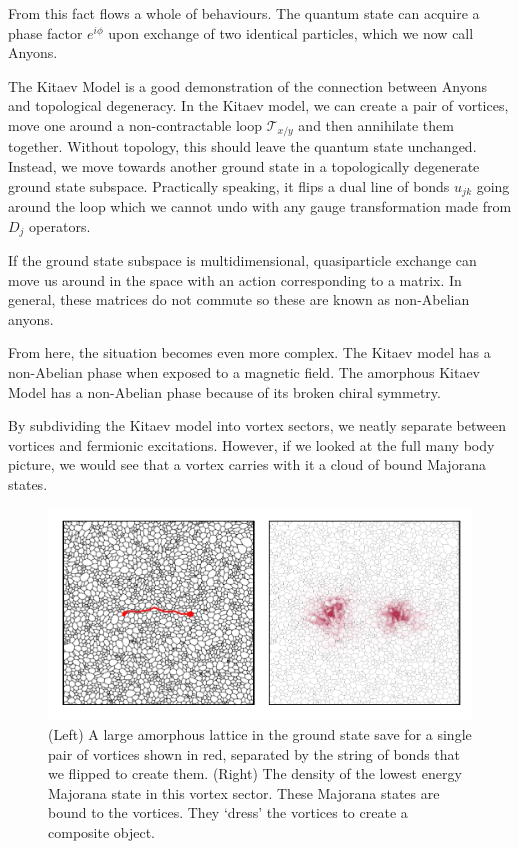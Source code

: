 From this fact flows a whole of behaviours. The quantum state can acquire a phase factor \(e^{i\phi}\) upon exchange of two identical particles, which we now call Anyons.

The Kitaev Model is a good demonstration of the connection between Anyons and topological degeneracy. In the Kitaev model, we can create a pair of vortices, move one around a non-contractable loop \(\mathcal{T}_{x/y}\) and then annihilate them together. Without topology, this should leave the quantum state unchanged. Instead, we move towards another ground state in a topologically degenerate ground state subspace. Practically speaking, it flips a dual line of bonds \(u_{jk}\) going around the loop which we cannot undo with any gauge transformation made from \(D_j\) operators.

If the ground state subspace is multidimensional, quasiparticle exchange can move us around in the space with an action corresponding to a matrix. In general, these matrices do not commute so these are known as non-Abelian anyons.

From here, the situation becomes even more complex. The Kitaev model has a non-Abelian phase when exposed to a magnetic field. The amorphous Kitaev Model has a non-Abelian phase because of its broken chiral symmetry.

By subdividing the Kitaev model into vortex sectors, we neatly separate between vortices and fermionic excitations. However, if we looked at the full many body picture, we would see that a vortex carries with it a cloud of bound Majorana states.

\hypertarget{fig:majorana_bound_states}{%
\begin{figure}
\centering
\includegraphics[width=1\textwidth,height=\textheight]{figure_code/amk_chapter/majorana_bound_states/majorana_bound_states}
\caption[{Majorana Bound States}]{(Left) A large amorphous lattice in the ground state save for a single pair of vortices shown in red, separated by the string of bonds that we flipped to create them. (Right) The density of the lowest energy Majorana state in this vortex sector. These Majorana states are bound to the vortices. They `dress' the vortices to create a composite object.}
\label{fig:majorana_bound_states}
\end{figure}
}

